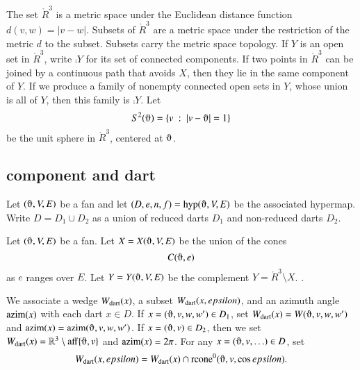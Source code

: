 The set $\ring{R}^3$ is a metric space under the
Euclidean distance function $d(v,w) = |v-w|$.  Subsets of
$\ring{R}^3$ are a metric space under the restriction of the metric
$d$ to the subset. Subsets carry the metric space topology. 
If $Y$ is an open set in $\ring{R}^3$, write
$\comp{Y}$ for its set of connected components.
If two
points in $\ring{R}^3$ 
can be joined by a continuous path that avoids $X$,
then they lie in the same component of $Y$.
If we produce a family of nonempty connected open sets in
$Y$, whose union is all of $Y$, then
this family is $\comp{Y}$.
Let $$S^2(\orgn) = \{ v \mid | v-\orgn | = 1\}$$ be the unit sphere in
$\ring{R}^3$, centered at $\orgn$.  






\subsection{component and dart}

Let $(\orgn,V,E)$ be a fan and let $(D,e,n,f) = \op{hyp}(\orgn,V,E)$
be the associated hypermap.  Write $D = D_1\cup D_2$ as a union of
reduced darts $D_1$ and non-reduced darts $D_2$.

\begin{definition}[X,~Y]\label{def:XY}
Let $(\orgn,V,E)$ be a fan.  Let $X=X(\orgn,V,E)$ be the union of the
cones
   $$C(\orgn,e)$$
as $e$ ranges over $E$.  Let $Y=Y(\orgn,V,E)$ be the complement
$Y = \ring{R}^3\setminus X$.
.
\end{definition}


We associate a wedge $W_{\text{dart}}(x)$, a subset $W_{\text{dart}}(x,epsilon)$,
and an azimuth angle ${\operatorname{azim}}(x)$
with each dart $x\in D$.  If
$x=(\orgn,v,w,w')\in D_1$, set
$\Wdart(x) = W(\orgn,v,w,w')$ and $\op{azim}(x) =
\op{azim}(\orgn,v,w,w')$.   If $x=(\orgn,v)\in D_2$, then we set
$\Wdart(x) = \ring{R}^3\setminus \op{aff}\{\orgn,v\}$ and ${\operatorname{azim}}(x) = 2\pi$.  For any $x = (\orgn,v,\ldots)\in D$, set
    $$
    \Wdart(x,\epsilon) = \Wdart(x) \cap \op{rcone}^0(\orgn,v,\cos\epsilon).
    $$


